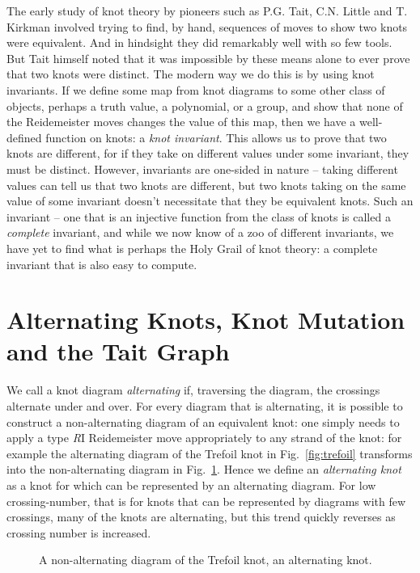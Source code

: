 \documentclass[12pt]{report}
\begin{document}
The early study of knot theory by pioneers such as P.G. Tait, C.N. Little and T. Kirkman involved trying to find, by hand, sequences of moves to show two knots were equivalent. And in hindsight they did remarkably well with so few tools. But Tait himself noted that it was impossible by these means alone to ever prove that two knots were distinct. The modern way we do this is by using knot invariants. If we define some map from knot diagrams to some other class of objects, perhaps a truth value, a polynomial, or a group, and show that none of the Reidemeister moves changes the value of this map, then we have a well-defined function on knots: a \textit{knot invariant}. This allows us to prove that two knots are different, for if they take on different values under some invariant, they must be distinct. However, invariants are one-sided in nature -- taking different values can tell us that two knots are different, but two knots taking on the same value of some invariant doesn't necessitate that they be equivalent knots. Such an invariant -- one that is an injective function from the class of knots is called a \textit{complete} invariant, and while we now know of a zoo of different invariants, we have yet to find what is perhaps the Holy Grail of knot theory: a complete invariant that is also easy to compute.

\section{Alternating Knots, Knot Mutation and the Tait Graph}
We call a knot diagram \textit{alternating} if, traversing the diagram, the crossings alternate under and over. For every diagram that is alternating, it is possible to construct a non-alternating diagram of an equivalent knot: one simply needs to apply a type \textit{R}I Reidemeister move appropriately to any strand of the knot: for example the alternating diagram of the Trefoil knot in Fig.~\ref{fig:trefoil} transforms into the non-alternating diagram in Fig.~\ref{fig:trefoil-nonalternating}. Hence we define an \textit{alternating knot} as a knot for which can be represented by an alternating diagram. For low crossing-number, that is for knots that can be represented by diagrams with few crossings, many of the knots are alternating, but this trend quickly reverses as crossing number is increased.

\begin{figure}[hbt]
	\centering
	\def\svgscale{0.23}
	
	\caption{A non-alternating diagram of the Trefoil knot, an alternating knot.}
	\label{fig:trefoil-nonalternating}
\end{figure}
\end{document}
